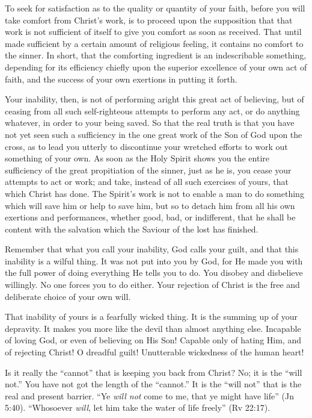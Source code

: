 \documentclass[
]{book}
\begin{document}
To seek for satisfaction as to the quality or quantity of your faith, before you will take comfort from Christ's work, is to proceed upon the supposition that that work is not sufficient of itself to give you comfort as soon as received. That until made sufficient by a certain amount of religious feeling, it contains no comfort to the sinner. In short, that the comforting ingredient is an indescribable something, depending for its efficiency chiefly upon the superior excellence of your own act of faith, and the success of your own exertions in putting it forth.

Your inability, then, is not of performing aright this great act of believing, but of ceasing from all such self-righteous attempts to perform any act, or do anything whatever, in order to your being saved. So that the real truth is that you have not yet seen such a sufficiency in the one great work of the Son of God upon the cross, as to lead you utterly to discontinue your wretched efforts to work out something of your own. As soon as the Holy Spirit shows you the entire sufficiency of the great propitiation of the sinner, just as he is, you cease your attempts to act or work; and take, instead of all such exercises of yours, that which Christ has done. The Spirit's work is not to enable a man to do something which will save him or help to save him, but so to detach him from all his own exertions and performances, whether good, bad, or indifferent, that he shall be content with the salvation which the Saviour of the lost has finished.

Remember that what you call your inability, God calls your guilt, and that this inability is a wilful thing. It was not put into you by God, for He made you with the full power of doing everything He tells you to do. You disobey and disbelieve willingly. No one forces you to do either. Your rejection of Christ is the free and deliberate choice of your own will.

That inability of yours is a fearfully wicked thing. It is the summing up of your depravity. It makes you more like the devil than almost anything else. Incapable of loving God, or even of believing on His Son! Capable only of hating Him, and of rejecting Christ! O dreadful guilt! Unutterable wickedness of the human heart!

Is it really the ``cannot'' that is keeping you back from Christ? No; it is the ``will not.'' You have not got the length of the ``cannot.'' It is the ``will not'' that is the real and present barrier. ``Ye \emph{will not} come to me, that ye might have life'' (Jn 5:40). ``Whosoever \emph{will}, let him take the water of life freely'' (Rv 22:17).
\end{document}
